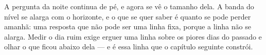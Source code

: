 A pergunta da noite continua de pé, e agora se vê o tamanho dela. A banda do nível se alarga
com o horizonte, e o que se quer saber é quanto se pode perder amanhã: uma resposta que não
pode ser uma linha fixa, porque a linha não se alarga. Medir o dia ruim exige erguer uma linha
sobre os piores dias do passado e olhar o que ficou abaixo dela --- e é essa linha que o
capítulo seguinte constrói.
